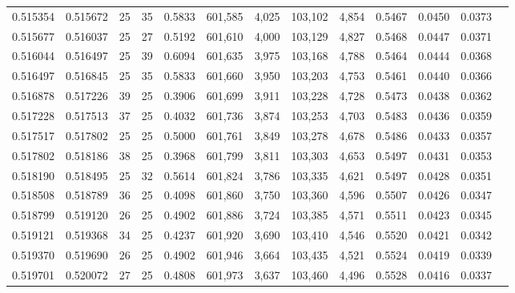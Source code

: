 \begin{tabular}{rrrrrrrrrrrrr}
0.515354 & 0.515672 &    25 &  35 &                                     0.5833 & 601,585 &   4,025 & 103,102 &   4,854 & 0.5467 & 0.0450 & 0.0373 \\
0.515677 & 0.516037 &    25 &  27 &                                     0.5192 & 601,610 &   4,000 & 103,129 &   4,827 & 0.5468 & 0.0447 & 0.0371 \\
0.516044 & 0.516497 &    25 &  39 &                                     0.6094 & 601,635 &   3,975 & 103,168 &   4,788 & 0.5464 & 0.0444 & 0.0368 \\
0.516497 & 0.516845 &    25 &  35 &                                     0.5833 & 601,660 &   3,950 & 103,203 &   4,753 & 0.5461 & 0.0440 & 0.0366 \\
0.516878 & 0.517226 &    39 &  25 &                                     0.3906 & 601,699 &   3,911 & 103,228 &   4,728 & 0.5473 & 0.0438 & 0.0362 \\
0.517228 & 0.517513 &    37 &  25 &                                     0.4032 & 601,736 &   3,874 & 103,253 &   4,703 & 0.5483 & 0.0436 & 0.0359 \\
0.517517 & 0.517802 &    25 &  25 &                                     0.5000 & 601,761 &   3,849 & 103,278 &   4,678 & 0.5486 & 0.0433 & 0.0357 \\
0.517802 & 0.518186 &    38 &  25 &                                     0.3968 & 601,799 &   3,811 & 103,303 &   4,653 & 0.5497 & 0.0431 & 0.0353 \\
0.518190 & 0.518495 &    25 &  32 &                                     0.5614 & 601,824 &   3,786 & 103,335 &   4,621 & 0.5497 & 0.0428 & 0.0351 \\
0.518508 & 0.518789 &    36 &  25 &                                     0.4098 & 601,860 &   3,750 & 103,360 &   4,596 & 0.5507 & 0.0426 & 0.0347 \\
0.518799 & 0.519120 &    26 &  25 &                                     0.4902 & 601,886 &   3,724 & 103,385 &   4,571 & 0.5511 & 0.0423 & 0.0345 \\
0.519121 & 0.519368 &    34 &  25 &                                     0.4237 & 601,920 &   3,690 & 103,410 &   4,546 & 0.5520 & 0.0421 & 0.0342 \\
0.519370 & 0.519690 &    26 &  25 &                                     0.4902 & 601,946 &   3,664 & 103,435 &   4,521 & 0.5524 & 0.0419 & 0.0339 \\
0.519701 & 0.520072 &    27 &  25 &                                     0.4808 & 601,973 &   3,637 & 103,460 &   4,496 & 0.5528 & 0.0416 & 0.0337 \\

\end{tabular}
